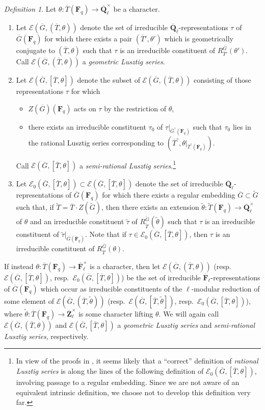 \documentclass[reqno]{amsart}
\numberwithin{equation}{subsection}
\newcommand{\F}{\mathbf{F}}
\newcommand{\wt}[1]{\widetilde{#1}}
\newcommand{\Q}{\mathbf{Q}}
\newcommand{\Z}{\mathbf{Z}}
\newcommand{\ol}[1]{\overline{#1}}
\newcommand{\co}{\colon}
\newcommand\cE{\mathcal{E}}
\theoremstyle{remark}
\newtheorem{defn}[thm]{Definition}
\numberwithin{equation}{subsection}
\numberwithin{figure}{subsection}
\begin{document}
\begin{defn}\label{defn:lusztig-series}
    Let $\theta\co \ol T(\F_q) \to \ol\Q_\ell^\times$ be a character.
    \begin{enumerate}
        \item Let $\cE(\ol G, (\ol T, \theta))$ denote the set of irreducible $\ol\Q_\ell$-representations $\tau$ of $\ol G(\F_q)$ for which there exists a pair $(\ol T', \theta')$ which is geometrically conjugate to $(\ol T, \theta)$ such that $\tau$ is an irreducible constituent of $R_{\ol T'}^{\ol G}(\theta')$. Call $\cE(\ol G, (\ol T, \theta))$ a \textit{geometric Lusztig series}.
        \item Let $\cE(\ol G, [\ol T, \theta])$ denote the subset of $\cE(\ol G, (\ol T,\theta))$ consisting of those representations $\tau$ for which
        \begin{itemize}
            \item $Z(\ol G)(\F_q)$ acts on $\tau$ by the restriction of $\theta$,
            \item there exists an irreducible constituent $\tau_0$ of $\tau|_{\ol G^\circ(\F_q)}$ such that $\tau_0$ lies in the rational Lusztig series corresponding to $(\ol T^\circ, \theta|_{\ol T^\circ(\F_q)})$.
        \end{itemize}
        Call $\cE(\ol G, [\ol T,\theta])$ a \textit{semi-rational Lusztig series}.\footnote{In view of the proofs in \cite[\S 11]{Bon06}, it seems likely that a ``correct'' definition of \emph{rational Lusztig series} is along the lines of the following definition of $\cE_0(\ol G, [\ol T, \theta])$, involving passage to a regular embedding. Since we are not aware of an equivalent intrinsic definition, we choose not to develop this definition very far.}
        \item Let $\cE_0(\ol G, [\ol T, \theta]) \subset \cE(\ol G, [\ol T,\theta])$ denote the set of irreducible $\ol\Q_\ell$-representations of $\ol G(\F_q)$ for which there exists a regular embedding $\ol G \subset \wt G$ such that, if $\wt T = \ol T \cdot Z(\wt G)$, then there exists an extension $\wt\theta\co \wt T(\F_q) \to \ol\Q_\ell^\times$ of $\theta$ and an irreducible constituent $\wt\tau$ of $R_{\wt T}^{\wt G}(\wt\theta)$ such that $\tau$ is an irreducible constituent of $\wt\tau|_{\ol G(\F_q)}$. Note that if $\tau \in \cE_0(\ol G, [\ol T, \theta])$, then $\tau$ is an irreducible constituent of $R_{\ol T}^{\ol G}(\theta)$.
    \end{enumerate}
    If instead $\theta\co \ol T(\F_q) \to \ol\F_\ell^\times$ is a character, then let $\cE(\ol G, (\ol T,\theta))$ (resp.\ $\cE(\ol G, [\ol T,\theta])$, resp.\ $\cE_0(\ol G, [\ol T, \theta])$) be the set of irreducible $\ol\F_\ell$-representations of $\ol G(\F_q)$ which occur as irreducible constituents of the $\ell$-modular reduction of some element of $\cE(\ol G, (\ol T,\wt\theta))$ (resp.\ $\cE(\ol G, [\ol T,\wt\theta])$, resp.\ $\cE_0(\ol G, [\ol T, \theta])$), where $\wt\theta\co \ol T(\F_q) \to \ol\Z_\ell^\times$ is some character lifting $\theta$. We will again call $\cE(\ol G, (\ol T,\theta))$ and $\cE(\ol G, [\ol T,\theta])$ a \textit{geometric Lusztig series} and \textit{semi-rational Lusztig series}, respectively.
\end{defn}
\end{document}
